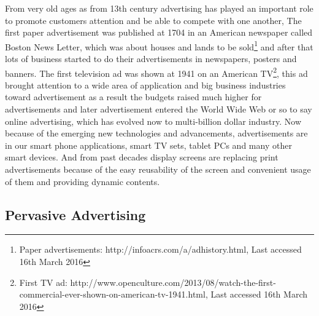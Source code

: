 From very old ages as from 13th century advertising has played an important role to promote customers attention and be able to compete with one another, The first paper advertisement was published at 1704 in an American newspaper called Boston News Letter, which was about houses and lands to be sold\footnote{Paper advertisements: http://infoacrs.com/a/adhistory.html, Last accessed 16th March 2016} and after that lots of business started to do their advertisements in newspapers, posters and banners. The first television ad was shown at 1941 on an American TV\footnote {First TV ad: http://www.openculture.com/2013/08/watch-the-first-commercial-ever-shown-on-american-tv-1941.html, Last accessed 16th March 2016}, this ad brought attention to a wide area of application and big business industries toward advertisement as a result the budgets raised much higher for advertisements and later advertisement entered the World Wide Web or so to say online advertising, which has evolved now to multi-billion dollar industry. Now because of the emerging new technologies and advancements, advertisements are in our smart phone applications, smart TV sets, tablet PCs and many other smart devices. And from past decades display screens are replacing print advertisements because of the easy reusability of the screen and convenient usage of them and providing dynamic contents.


\subsection{Pervasive Advertising}

